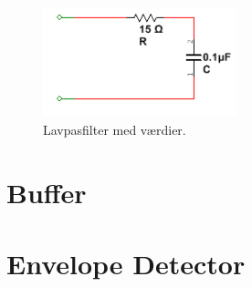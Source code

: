 	
\begin{figure}[htbp]
	\centering
	\includegraphics[width=0.50\textwidth]{billeder/HWdesign/LP_MV.png}
	\caption{Lavpasfilter med værdier.}
	\label{fig:LP_MV}
\end{figure}

\section{Buffer}

\section{Envelope Detector}
